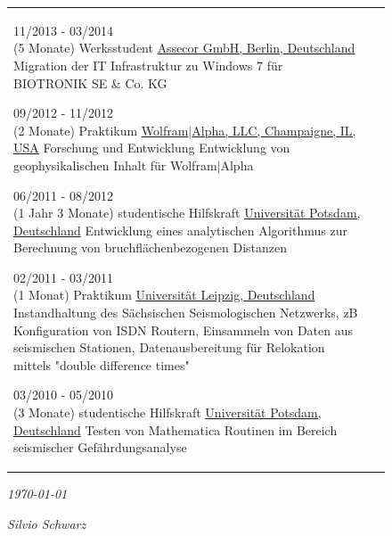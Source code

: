 \documentclass{scrartcl}
\newcommand{\entry}[4]{%
  \parbox[t]{3cm}{#1}&\parbox[t]{10cm}{%
    \textbf{#2}%
    \hfill%
    {\footnotesize \color{pblue} #3}\\%
    #4\\ \vspace{\parsep}%
  }\\}
\begin{document}
\begin{figure}[htb]
\begin{minipage}[t]{0.72\textwidth}
\begin{tabular*}{\textwidth}{@{\extracolsep{\fill}}ll}
	    \entry
	    {11/2013 - 03/2014 \\ (5 Monate)}
	    {Werksstudent}
	    {\href{https://assecor.de/}{Assecor GmbH, Berlin, Deutschland}}
	    {Migration der IT Infrastruktur zu Windows 7 für \\BIOTRONIK SE \& Co. KG}
	    
	    \entry
	    {09/2012 - 11/2012 \\ (2 Monate)}
	    {Praktikum}
	    {\href{https:///www.wolframalpha.com/}{Wolfram$\mid$Alpha, LLC, Champaigne, IL, USA}}
	    {Forschung und Entwicklung\\
	    Entwicklung von geophysikalischen Inhalt für Wolfram$\mid$Alpha}
	    
	    \entry
	    {06/2011 - 08/2012 \\ (1 Jahr 3 Monate)}
	    {studentische Hilfskraft}
	    {\href{https://www.uni-potsdam.de/}{Universität Potsdam, Deutschland}}
	    {Entwicklung eines analytischen Algorithmus zur Berechnung von bruchflächenbezogenen Distanzen}
	    
	    \entry
	    {02/2011 - 03/2011 \\ (1 Monat)}
	    {Praktikum} 
	    {\href{https://www.zv.uni-leipzig.de/}{Universität Leipzig, Deutschland}}
	    {Instandhaltung des Sächsischen Seismologischen Netzwerks, zB Konfiguration von ISDN Routern, Einsammeln von Daten aus seismischen Stationen, Datenausbereitung für Relokation mittels "double difference times"}
	    
	    \entry
	    {03/2010 - 05/2010 \\ (3 Monate)}
	    {studentische Hilfskraft}
	    {\href{https://www.uni-potsdam.de/}{Universität Potsdam, Deutschland}}
	    {Testen von Mathematica Routinen im Bereich seismischer Gefährdungsanalyse}
	    
	    \end{tabular*}	
	    \vspace{2cm}
\begin{flushleft}
\emph{\today}
\end{flushleft}
\begin{flushright}
\emph{Silvio Schwarz}
\end{flushright}
	\end{minipage}
\end{figure}
\end{document}
